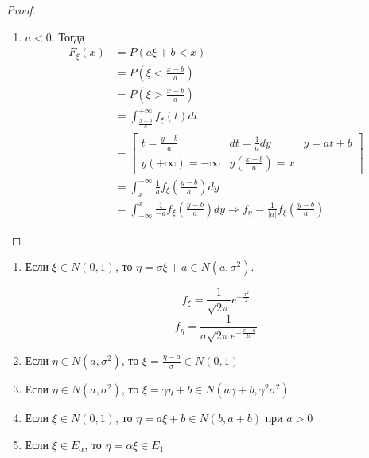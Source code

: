 \begin{proof}
\begin{enumerate}
        \item \(a < 0\). Тогда
              \begin{align*}
                  F_\xi(x) & = P(a\xi + b < x)                                                        \\
                           & = P\left( \xi < \frac{x - b}{a} \right)                                  \\
                           & = P\left( \xi > \frac{x - b}{a} \right)                                  \\
                           & = \int_{\frac{x - b}{a}}^{+\infty} f_\xi(t) dt                           \\
                           & = \begin{bmatrix}
                      t = \frac{y - b}{a}   & dt = \frac{1}{a}dy                  & y = at + b \\
                      y( +\infty) = -\infty & y\left( \frac{x - b}{a} \right) = x
                  \end{bmatrix}                                             \\
                           & = \int_{x}^{-\infty} \frac{1}{a} f_\xi\left( \frac{y - b}{a} \right) dy  \\
                           & = \int_{-\infty}^{x} \frac{1}{-a} f_\xi\left( \frac{y - b}{a} \right) dy
                  \Rightarrow f_\eta = \frac{1}{|a|} f_\xi\left( \frac{y - b}{a} \right)
              \end{align*}
    \end{enumerate}
\end{proof}

\begin{enumerate}
    \item Если \(\xi \in N(0, 1)\), то \(\eta = \sigma \xi + a \in N(a, \sigma^2)\).
          \begin{prop}
              \[f_\xi = \frac{1}{\sqrt{2\pi}} e^{ - \frac{x^2}{2}}\]
              \[f_\eta = \frac{1}{\sigma \sqrt{2\pi} e^{ - \frac{x - a}{2\sigma}}}\]
          \end{prop}
    \item Если \(\eta \in N(a, \sigma^2)\), то \(\xi = \frac{\eta - a}{\sigma} \in N(0, 1)\)
    \item Если \(\eta \in N(a, \sigma^2)\), то \(\xi = \gamma \eta + b \in N(a\gamma + b, \gamma^2 \sigma^2)\)
    \item Если \(\xi \in N(0, 1)\), то \(\eta = a \xi + b \in N(b, a + b)\) при \(a > 0\)
    \item Если \(\xi \in E_\alpha\), то \(\eta = \alpha \xi \in E_1\)
\end{enumerate}

